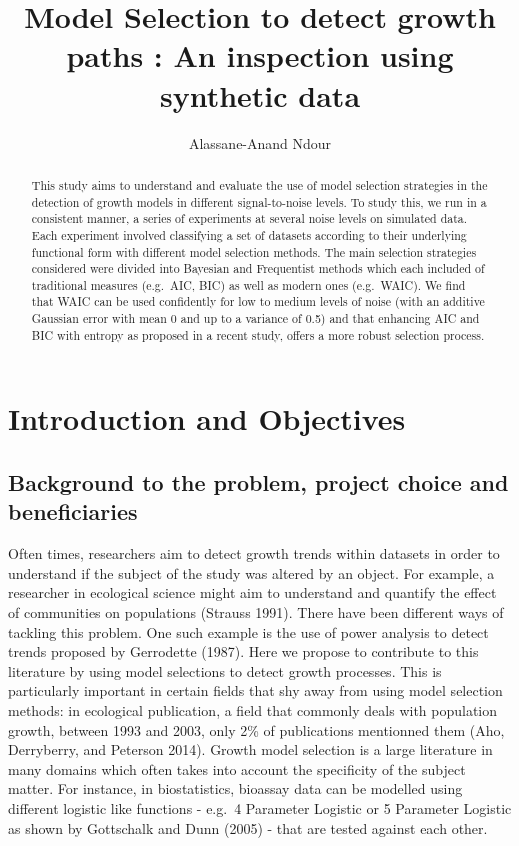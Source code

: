 \documentclass[12pt,]{article}
\title{Model Selection to detect growth paths : An inspection using synthetic data}
\author{Alassane-Anand Ndour}
\date{}
\begin{document}
\maketitle
\begin{abstract}
This study aims to understand and evaluate the use of model selection strategies in the detection of growth models in different signal-to-noise levels. To study this, we run in a consistent manner, a series of experiments at several noise levels on simulated data. Each experiment involved classifying a set of datasets according to their underlying functional form with different model selection methods. The main selection strategies considered were divided into Bayesian and Frequentist methods which each included of traditional measures (e.g.~AIC, BIC) as well as modern ones (e.g.~WAIC). We find that WAIC can be used confidently for low to medium levels of noise (with an additive Gaussian error with mean 0 and up to a variance of 0.5) and that enhancing AIC and BIC with entropy as proposed in a recent study, offers a more robust selection process.
\end{abstract}

{
\hypersetup{linkcolor=black}
\setcounter{tocdepth}{2}
\tableofcontents
}
\newpage

\hypertarget{introduction-and-objectives}{%
\section{Introduction and Objectives}\label{introduction-and-objectives}}

\hypertarget{background-to-the-problem-project-choice-and-beneficiaries}{%
\subsection{Background to the problem, project choice and beneficiaries}\label{background-to-the-problem-project-choice-and-beneficiaries}}

Often times, researchers aim to detect growth trends within datasets in order to understand if the subject of the study was altered by an object. For example, a researcher in ecological science might aim to understand and quantify the effect of communities on populations (Strauss 1991). There have been different ways of tackling this problem. One such example is the use of power analysis to detect trends proposed by Gerrodette (1987). Here we propose to contribute to this literature by using model selections to detect growth processes. This is particularly important in certain fields that shy away from using model selection methods: in ecological publication, a field that commonly deals with population growth, between 1993 and 2003, only 2\% of publications mentionned them (Aho, Derryberry, and Peterson 2014). Growth model selection is a large literature in many domains which often takes into account the specificity of the subject matter. For instance, in biostatistics, bioassay data can be modelled using different logistic like functions - e.g.~4 Parameter Logistic or 5 Parameter Logistic as shown by Gottschalk and Dunn (2005) - that are tested against each other.
\end{document}
